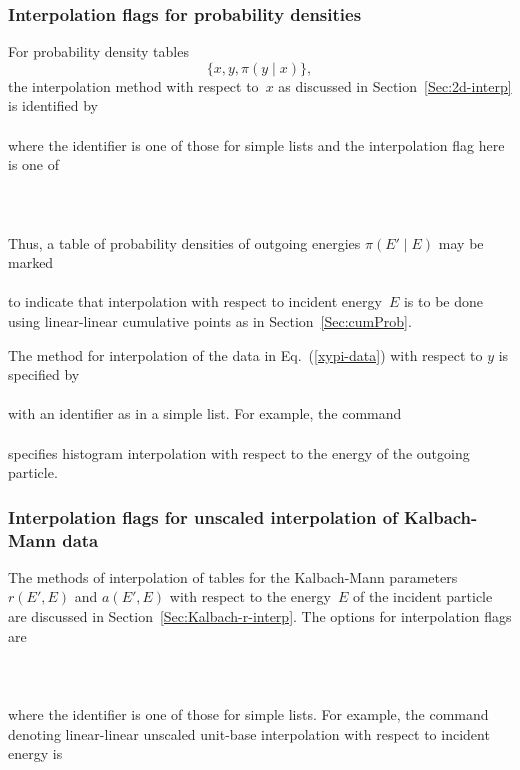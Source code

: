 \subsubsection{Interpolation flags for probability densities}\label{interp-flags-probability}
For probability density tables 
\begin{equation}
  \{x, y, \pi(y \mid x) \},
 \label{xypi-data}
\end{equation}
the interpolation
method with respect to~$x$ as discussed in Section~\ref{Sec:2d-interp}
is identified by\\
   \\
where the identifier is one of those for simple lists and the
interpolation flag here is one of\\
   \\
   \\
   \\
Thus, a table of probability densities of outgoing energies $\pi( E' \mid E)$ may
be marked\\
   \\
to indicate that interpolation with respect to incident energy~$E$ is to be done
using linear-linear cumulative points as in Section~\ref{Sec:cumProb}.

The method for interpolation of the data in Eq.~(\ref{xypi-data}) with
respect to $y$ is specified by\\
   \\
with an identifier as in a simple list.  For example, the command\\
   \\
specifies histogram interpolation with respect to the energy of
the outgoing particle.

\subsubsection{Interpolation flags for unscaled interpolation of
Kalbach-Mann data}\label{interp-flags-Kalbach-r}
The methods of interpolation of tables for the Kalbach-Mann 
parameters $r(E', E)$ and $a(E', E)$ with respect to the energy~$E$
of the incident particle are discussed in Section~\ref{Sec:Kalbach-r-interp}.
The options for interpolation flags are\\
   \\
   \\
   \\
where the identifier is one of those for simple lists. 
For example, the command denoting linear-linear unscaled unit-base interpolation
with respect to incident energy is\\

